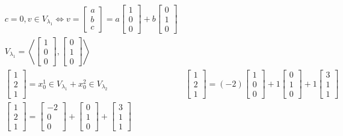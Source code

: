 \documentclass[../main.tex]{subfiles}
\begin{document}
\begin{przyklad}
\begin{align*}
    &c = 0, v\in V_{\lambda_1}\iff v = \begin{bmatrix} a\\b\\c \end{bmatrix}  = a \begin{bmatrix} 1\\0\\0 \end{bmatrix} +b \begin{bmatrix} 0\\1\\0 \end{bmatrix}\\
    &V_{\lambda_1} = \left<\begin{bmatrix} 1\\0\\0 \end{bmatrix}, \begin{bmatrix} 0\\1\\0 \end{bmatrix}  \right>\\
    &\begin{bmatrix} 1\\2\\1 \end{bmatrix} = x_0^1\in V_{\lambda_1} + x_0^2\in V_{\lambda_2}
    &\begin{bmatrix} 1\\2\\1 \end{bmatrix} = (-2)\begin{bmatrix} 1\\0\\0 \end{bmatrix} + 1\begin{bmatrix} 0\\1\\0 \end{bmatrix} + 1\begin{bmatrix} 3\\1\\1 \end{bmatrix} \\
    &\begin{bmatrix} 1\\2\\1 \end{bmatrix} = \begin{bmatrix} -2\\0\\0 \end{bmatrix} + \begin{bmatrix} 0\\1\\0 \end{bmatrix} + \begin{bmatrix} 3\\1\\1 \end{bmatrix}\\

\end{align*}
\end{przyklad}
\end{document}
